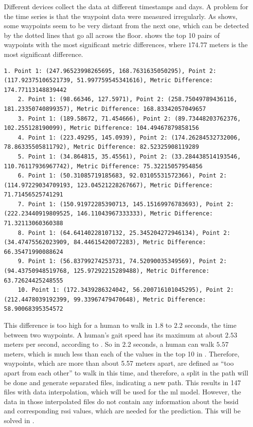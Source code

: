 Different devices collect the data at different timestamps and days.
A problem for the time series is that the waypoint data were measured irregularly.
As  shows, some waypoints seem to be very distant from the next one, which can be detected by the dotted lines that go all across the floor.
 shows the top 10 pairs of waypoints with the most significant metric differences, where \(174.77\) meters is the most significant difference.\\

\begin{lstlisting}[caption={Top 10 pairs with the most significant metric differences of data from floor F1 of site Yintai City (Chengxi Branch)},label={lst:metric-diff}]
    1. Point 1: (247.96523998265695, 168.7631635050295), Point 2: (117.92375106521739, 51.997759545341616), Metric Difference: 174.77113148839442
    2. Point 1: (98.66346, 127.5971), Point 2: (258.75049789436116, 181.23350740899357), Metric Difference: 168.83342057049657
    3. Point 1: (189.58672, 71.454666), Point 2: (89.73448203762376, 102.255128190099), Metric Difference: 104.49467879858156
    4. Point 1: (223.49295, 145.0939), Point 2: (174.26284532732006, 78.86335505811792), Metric Difference: 82.52325908119289
    5. Point 1: (34.864815, 35.45561), Point 2: (33.284438514193546, 110.76117936967742), Metric Difference: 75.32215057954856
    6. Point 1: (50.31085719185683, 92.03105531572366), Point 2: (114.97229034709193, 123.04521228267667), Metric Difference: 71.71456525741291
    7. Point 1: (150.91972285390713, 145.15169976783693), Point 2: (222.23440919809525, 146.11043967333333), Metric Difference: 71.32113060360388
    8. Point 1: (64.64140228107132, 25.345204272946134), Point 2: (34.47475562023909, 84.44615420072283), Metric Difference: 66.35471990088624
    9. Point 1: (56.83799274253731, 74.52090035349569), Point 2: (94.43750948519768, 125.97292215289488), Metric Difference: 63.72624425248555
    10. Point 1: (172.3439286324042, 56.200716101045295), Point 2: (212.4478039192399, 99.33967479470648), Metric Difference: 58.90068395354572
\end{lstlisting}

This difference is too high for a human to walk in \(1.8\) to \(2.2\) seconds, the time between two waypoints.
A human's gait speed has its maximum at about \(2.53\) meters per second, according to \cite{bohannonComfortableMaximumWalking1997}.
So in \(2.2\) seconds, a human can walk \(5.57\) meters, which is much less than each of the values in the top 10 in .
Therefore, waypoints, which are more than about 5.57 meters apart, are defined as ``too apart from each other'' to walk in this time, and therefore, a split in the path will be done and generate separated files, indicating a new path.
This results in 147 files with data interpolation, which will be used for the \ac{ml} model.
However, the data in those interpolated files do not contain any information about the \ac{bssid} and corresponding \ac{rssi} values, which are needed for the prediction.
This will be solved in .


